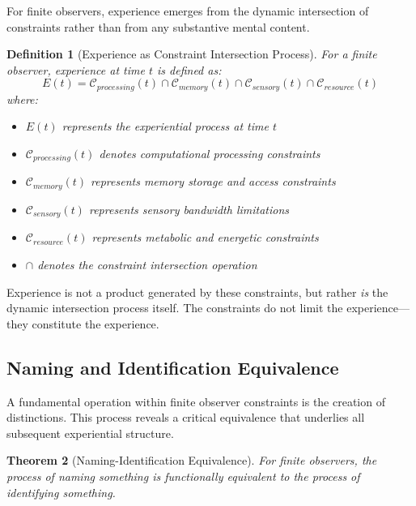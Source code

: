 \documentclass{article}
\newtheorem{theorem}{Theorem}[section]
\newtheorem{definition}[theorem]{Definition}
\begin{document}
For finite observers, experience emerges from the dynamic intersection of constraints rather than from any substantive mental content.

\begin{definition}[Experience as Constraint Intersection Process]
For a finite observer, experience at time $t$ is defined as:
\begin{equation}
E(t) = \mathcal{C}_{processing}(t) \cap \mathcal{C}_{memory}(t) \cap \mathcal{C}_{sensory}(t) \cap \mathcal{C}_{resource}(t)
\end{equation}
where:
\begin{itemize}
\item $E(t)$ represents the experiential process at time $t$
\item $\mathcal{C}_{processing}(t)$ denotes computational processing constraints
\item $\mathcal{C}_{memory}(t)$ represents memory storage and access constraints
\item $\mathcal{C}_{sensory}(t)$ represents sensory bandwidth limitations
\item $\mathcal{C}_{resource}(t)$ represents metabolic and energetic constraints
\item $\cap$ denotes the constraint intersection operation
\end{itemize}
\end{definition}

Experience is not a product generated by these constraints, but rather \textit{is} the dynamic intersection process itself. The constraints do not limit the experience—they constitute the experience.

\subsection{Naming and Identification Equivalence}

A fundamental operation within finite observer constraints is the creation of distinctions. This process reveals a critical equivalence that underlies all subsequent experiential structure.

\begin{theorem}[Naming-Identification Equivalence]
For finite observers, the process of naming something is functionally equivalent to the process of identifying something.
\end{theorem}
\end{document}
